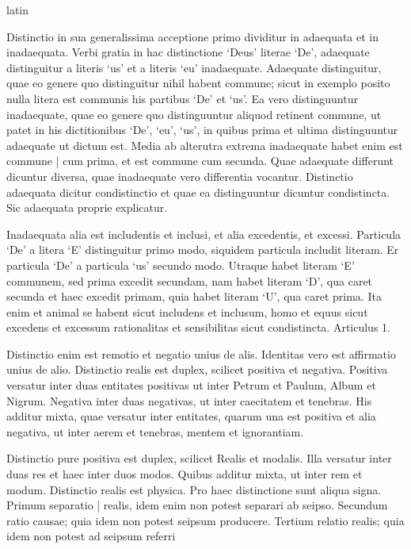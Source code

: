 \begin{otherlanguage*}{latin}
        \pstart
        \pend
      
\pstart
 Distinctio in sua generalissima acceptione primo dividitur in adaequata et in inadaequata. Verbi gratia in hac distinctione `Deus' literae `De', adaequate distinguitur a literis `us' et a literis `eu' inadaequate. Adaequate distinguitur, quae eo genere quo distinguitur nihil habent commune; sicut in exemplo posito nulla litera est communis his partibus `De' et `us'. Ea vero distinguuntur inadaequate, quae eo genere quo distinguuntur aliquod retinent commune, ut patet in his dictitionibus `De', `eu', `us', in quibus prima et ultima distinguuntur adaequate ut dictum est. Media ab alterutra extrema inadaequate habet enim est commune \textnormal{|}  cum prima, et est commune cum secunda. Quae adaequate differunt dicuntur diversa, quae inadaequate vero differentia vocantur. Distinctio adaequata dicitur condistinctio et quae ea distinguuntur dicuntur condistincta. Sic adaequata proprie explicatur. 
\pend

\pstart
 Inadaequata alia est includentis et inclusi, et alia excedentis, et excessi. Particula `De' a litera `E' distinguitur primo modo, siquidem particula includit literam. Er particula `De' a particula `us' secundo modo. Utraque habet literam `E' communem, sed prima excedit secundam, nam habet literam `D', qua caret secunda et haec excedit primam, quia habet literam `U', qua caret prima. Ita enim et animal se habent sicut includens et inclusum, homo et equus sicut excedens et excessum rationalitas et sensibilitas sicut condistincta. Articulus 1. 
\pend

        \pstart
        \pend
      
\pstart
 Distinctio enim est remotio et negatio unius de alis. Identitas vero est affirmatio unius de alio. Distinctio realis est duplex, scilicet positiva et negativa. Positiva versatur inter duas entitates positivas ut inter Petrum et Paulum, Album et Nigrum. Negativa inter duas negativas, ut inter caecitatem et tenebras. His additur mixta, quae versatur inter entitates, quarum una est positiva et alia negativa, ut inter aerem et tenebras, mentem et ignorantiam. 
\pend

\pstart
 Distinctio pure positiva est duplex, scilicet Realis et modalis. Illa versatur inter duas res et haec inter duos modos. Quibus additur mixta, ut inter rem et modum. Distinctio realis est physica. Pro haec distinctione sunt aliqua signa. Primum separatio \textnormal{|}  realis, idem enim non potest separari ab seipso. Secundum ratio causae; quia idem non potest seipsum producere. Tertium relatio realis; quia idem non potest ad seipsum referri 
\pend


\end{otherlanguage*}
